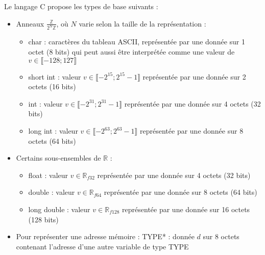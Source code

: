 \documentclass[../../../main.tex]{subfiles}
\begin{document}
Le langage C propose les types de base suivants :
\begin{itemize}
\item Anneaux $\frac{\mathbb{Z}}{2^N\mathbb{Z}}$, où $N$ varie selon la taille de la représentation :
\begin{itemize}
	\item \textsf{char} : caractères du tableau ASCII, représentée par une donnée sur 1 octet (8 bits) qui peut aussi être interprétée comme une valeur de $v\in\llbracket-128; 127\rrbracket$ 
	\item \textsf{short int} : valeur $v\in{\llbracket-2^{15}; 2^{15}-1\rrbracket}$ représentée par une donnée sur 2 octets (16 bits) 
	\item \textsf{int} : valeur $v\in{\llbracket-2^{31}; 2^{31}-1\rrbracket}$ représentée par une donnée sur 4 octets (32 bits) 
	\item \textsf{long int} : valeur $v\in{\llbracket-2^{63}; 2^{63}-1\rrbracket}$ représentée par une donnée sur 8 octets (64 bits)
\end{itemize}
\item Certains sous-ensembles de $\mathbb{R}$ :
\begin{itemize}
	\item \textsf{float} : valeur $v\in{\mathbb{R}_{f32}}$ représentée par une donnée sur 4 octets (32 bits)
	\item \textsf{double} : valeur $v\in{\mathbb{R}_{f64}}$ représentée par une donnée sur 8 octets (64 bits)
	\item \textsf{long double} : valeur $v\in{\mathbb{R}_{f128}}$ représentée par une donnée sur 16 octets (128 bits)
\end{itemize}
\item Pour représenter une adresse mémoire : \textsf{TYPE*} : donnée $d$ sur 8 octets contenant l'adresse d'une autre variable de type \textsf{TYPE}
\end{itemize}
\end{document}

